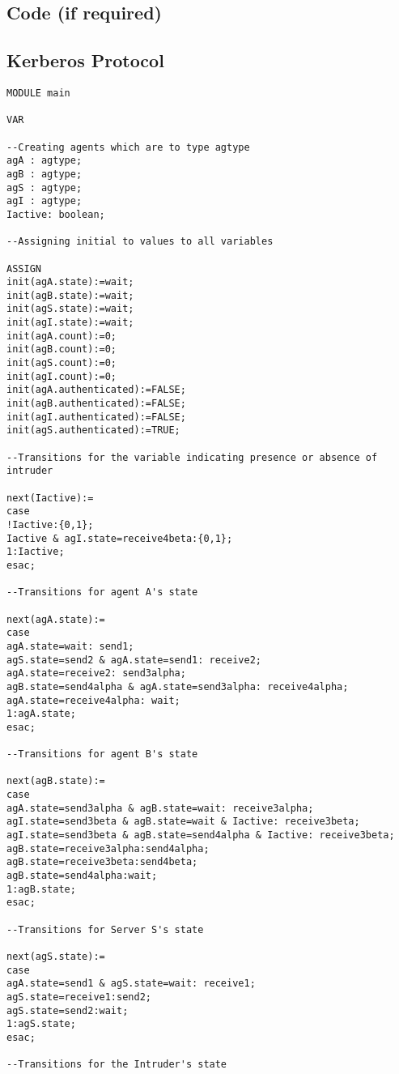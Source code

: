 \begin{appendix}

\chapter{Code (if required)}
\section{Kerberos Protocol}
\scriptsize{
\begin{verbatim}
MODULE main

VAR

--Creating agents which are to type agtype
agA : agtype; 
agB : agtype;
agS : agtype;
agI : agtype;
Iactive: boolean;

--Assigning initial to values to all variables

ASSIGN
init(agA.state):=wait;
init(agB.state):=wait;
init(agS.state):=wait;
init(agI.state):=wait;
init(agA.count):=0;
init(agB.count):=0;
init(agS.count):=0;
init(agI.count):=0;
init(agA.authenticated):=FALSE;
init(agB.authenticated):=FALSE;
init(agI.authenticated):=FALSE;
init(agS.authenticated):=TRUE;

--Transitions for the variable indicating presence or absence of intruder

next(Iactive):=
case
!Iactive:{0,1};
Iactive & agI.state=receive4beta:{0,1};
1:Iactive;
esac;

--Transitions for agent A's state

next(agA.state):=
case
agA.state=wait: send1;
agS.state=send2 & agA.state=send1: receive2;
agA.state=receive2: send3alpha;
agB.state=send4alpha & agA.state=send3alpha: receive4alpha;
agA.state=receive4alpha: wait;
1:agA.state;
esac;

--Transitions for agent B's state

next(agB.state):=
case
agA.state=send3alpha & agB.state=wait: receive3alpha;
agI.state=send3beta & agB.state=wait & Iactive: receive3beta;
agI.state=send3beta & agB.state=send4alpha & Iactive: receive3beta;
agB.state=receive3alpha:send4alpha;
agB.state=receive3beta:send4beta;
agB.state=send4alpha:wait;
1:agB.state;
esac;

--Transitions for Server S's state

next(agS.state):=
case
agA.state=send1 & agS.state=wait: receive1;
agS.state=receive1:send2;
agS.state=send2:wait;
1:agS.state;
esac;

--Transitions for the Intruder's state


\end{verbatim}}
\end{appendix}
